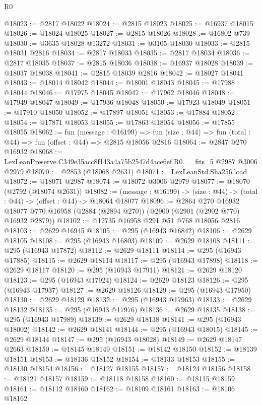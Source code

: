 \begin{lexlean}{R0}
\begin{coremodule}
@18023 := @2817 @18022
@18024 := @2815 @18023
@18025 := @16937 @18015
@18026 := @18024 @18025
@18027 := @2815 @18026
@18028 := @16802 @739
@18030 := @3635 @18028 @13272
@18031 := @3105 @18030
@18033 := @2815 @18031 @2816
@18034 := @2817 @18033
@18035 := @2817 @18034
@18036 := @2817 @18035
@18037 := @2815 @18036
@18038 := @16937 @18028
@18039 := @18037 @18038
@18041 := @2815 @18039 @2816
@18042 := @18027 @18041
@18043 := @18014 @18042
@18044 := @18001 @18043
@18045 := @17988 @18044
@18046 := @17975 @18045
@18047 := @17962 @18046
@18048 := @17949 @18047
@18049 := @17936 @18048
@18050 := @17923 @18049
@18051 := @17910 @18050
@18052 := @17897 @18051
@18053 := @17884 @18052
@18054 := @17871 @18053
@18055 := @17863 @18054
@18056 := @17855 @18055
@18062 := fun (message : @16199) =>
  fun (size : @44) => fun (total : @44) => fun (offset : @44) => @2815 @18056 @2816
@18064 := @2847 @270 @16932
@18068 := LexLeanPreserve.C349e35acc8f143a4a75b2547d4ace6ef.R0.__fits_5 @2987 @3006 @2979
@18070 := @2853 (@18068 @2631)
@18071 := LexLeanStd.Sha256.load
@18072 := @18071 @2987
@18074 := @18072 @3006 @2979
@18077 := @18070 (@2792 (@18074 @2631))
@18082 := (message : @16199) -> (size : @44) -> (total : @44) -> (offset : @44) -> @18064 @18077
@18096 := @2864
    @270
    @16932
    @18077
    @770
    @16958
    (@2884 (@2894 @270))
    (@2900 (@2901 (@2902 @770) @16932 @2879))
@18102 := @12735 @16958 @291 @51 @768 @18056 @2816
@18103 := @2629 @16945
@18105 := @295 (@16943 @16842)
@18106 := @2629 @18105
@18108 := @295 (@16943 @16803)
@18109 := @2629 @18108
@18111 := @295 (@16943 @17872)
@18112 := @2629 @18111
@18114 := @295 (@16943 @17885)
@18115 := @2629 @18114
@18117 := @295 (@16943 @17898)
@18118 := @2629 @18117
@18120 := @295 (@16943 @17911)
@18121 := @2629 @18120
@18123 := @295 (@16943 @17924)
@18124 := @2629 @18123
@18126 := @295 (@16943 @17937)
@18127 := @2629 @18126
@18129 := @295 (@16943 @17950)
@18130 := @2629 @18129
@18132 := @295 (@16943 @17963)
@18133 := @2629 @18132
@18135 := @295 (@16943 @17976)
@18136 := @2629 @18135
@18138 := @295 (@16943 @17989)
@18139 := @2629 @18138
@18141 := @295 (@16943 @18002)
@18142 := @2629 @18141
@18144 := @295 (@16943 @18015)
@18145 := @2629 @18144
@18147 := @295 (@16943 @18028)
@18149 := @2629 @18147 @2663
@18150 := @18145 @18149
@18151 := @18142 @18150
@18152 := @18139 @18151
@18153 := @18136 @18152
@18154 := @18133 @18153
@18155 := @18130 @18154
@18156 := @18127 @18155
@18157 := @18124 @18156
@18158 := @18121 @18157
@18159 := @18118 @18158
@18160 := @18115 @18159
@18161 := @18112 @18160
@18162 := @18109 @18161
@18163 := @18106 @18162

\end{coremodule}
\end{lexlean}
